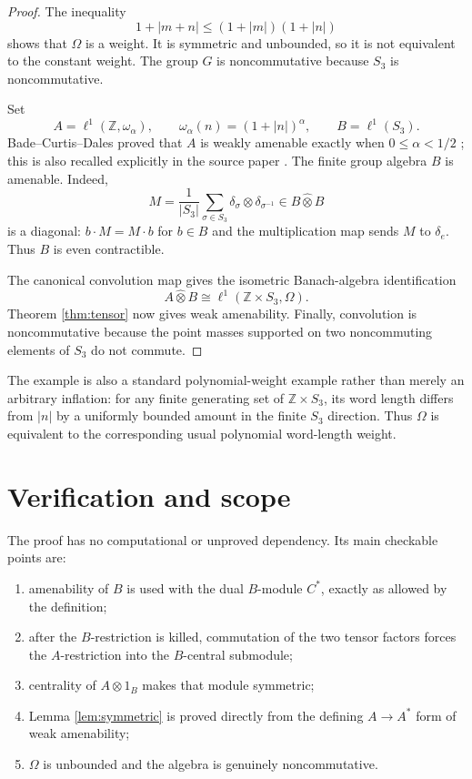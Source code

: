\documentclass[11pt]{article}
\newcommand{\Z}{\mathbb Z}
\begin{document}
\begin{proof}
The inequality
\[
  1+|m+n|\leq(1+|m|)(1+|n|)
\]
shows that $\Omega$ is a weight.  It is symmetric and unbounded, so it is not
equivalent to the constant weight.  The group $G$ is noncommutative because
$S_3$ is noncommutative.

Set
\[
 A=\ell^1(\Z,\omega_\alpha),\qquad
 \omega_\alpha(n)=(1+|n|)^\alpha,
 \qquad B=\ell^1(S_3).
\]
Bade--Curtis--Dales proved that $A$ is weakly amenable exactly when
$0\leq\alpha<1/2$ \cite{BCD}; this is also recalled explicitly in the source
paper \cite[p.~3]{SZ}.  The finite group algebra $B$ is amenable.  Indeed,
\[
       M=\frac1{|S_3|}\sum_{\sigma\in S_3}
              \delta_\sigma\otimes\delta_{\sigma^{-1}}
       \in B\widehat\otimes B
\]
is a diagonal: $b\cdot M=M\cdot b$ for $b\in B$ and the multiplication map
sends $M$ to $\delta_e$.  Thus $B$ is even contractible.

The canonical convolution map gives the isometric Banach-algebra
identification
\[
  A\widehat\otimes B
     \cong \ell^1(\Z\times S_3,\Omega).
\]
Theorem \ref{thm:tensor} now gives weak amenability.  Finally, convolution is
noncommutative because the point masses supported on two noncommuting
elements of $S_3$ do not commute.
\end{proof}

The example is also a standard polynomial-weight example rather than merely
an arbitrary inflation: for any finite generating set of $\Z\times S_3$, its
word length differs from $|n|$ by a uniformly bounded amount in the finite
$S_3$ direction.  Thus $\Omega$ is equivalent to the corresponding usual
polynomial word-length weight.

\section{Verification and scope}

The proof has no computational or unproved dependency.  Its main checkable
points are:
\begin{enumerate}
\item amenability of $B$ is used with the dual $B$-module $C^*$, exactly as
      allowed by the definition;
\item after the $B$-restriction is killed, commutation of the two tensor
      factors forces the $A$-restriction into the $B$-central submodule;
\item centrality of $A\otimes1_B$ makes that module symmetric;
\item Lemma \ref{lem:symmetric} is proved directly from the defining
      $A\to A^*$ form of weak amenability;
\item $\Omega$ is unbounded and the algebra is genuinely noncommutative.
\end{enumerate}
\end{document}
